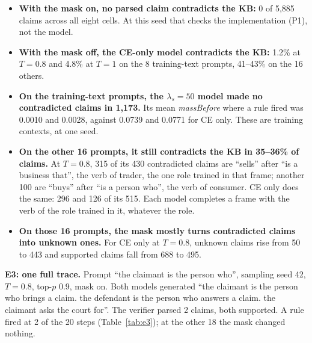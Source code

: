 \documentclass[letterpaper, 10pt, conference]{IEEEtran}
\begin{document}
\begin{itemize}
\item \textbf{With the mask on, no parsed claim contradicts the KB:} 0 of 5,885 claims across all eight cells. At this seed that checks the implementation (P1), not the model.
\item \textbf{With the mask off, the CE-only model contradicts the KB:} 1.2\% at $T{=}0.8$ and 4.8\% at $T{=}1$ on the 8 training-text prompts, 41--43\% on the 16 others.
\item \textbf{On the training-text prompts, the $\lambda_s{=}50$ model made no contradicted claims in 1,173.} Its mean \textit{massBefore} where a rule fired was 0.0010 and 0.0028, against 0.0739 and 0.0771 for CE only. These are training contexts, at one seed.
\item \textbf{On the other 16 prompts, it still contradicts the KB in 35--36\% of claims.} At $T{=}0.8$, 315 of its 430 contradicted claims are ``sells'' after ``is a business that'', the verb of trader, the one role trained in that frame; another 100 are ``buys'' after ``is a person who'', the verb of consumer. CE only does the same: 296 and 126 of its 515. Each model completes a frame with the verb of the role trained in it, whatever the role.
\item \textbf{On those 16 prompts, the mask mostly turns contradicted claims into unknown ones.} For CE only at $T{=}0.8$, unknown claims rise from 50 to 443 and supported claims fall from 688 to 495.
\end{itemize}

\textbf{E3: one full trace.} Prompt ``the claimant is the person who'', sampling seed 42, $T{=}0.8$, top-$p$ 0.9, mask on. Both models generated ``the claimant is the person who brings a claim. the defendant is the person who answers a claim. the claimant asks the court for''. The verifier parsed 2 claims, both supported. A rule fired at 2 of the 20 steps (Table~\ref{tab:e3}); at the other 18 the mask changed nothing.
\end{document}
